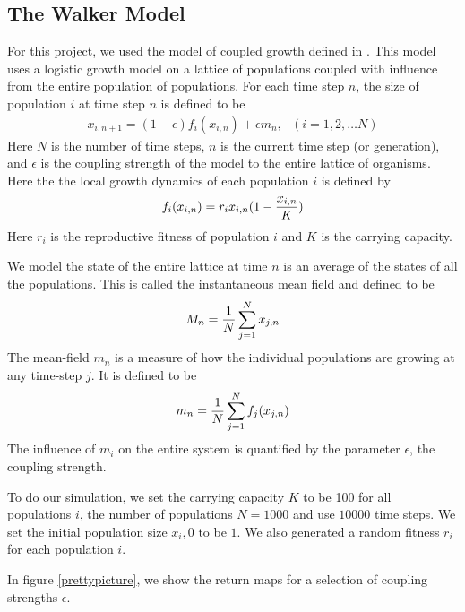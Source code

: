 \documentclass[conference]{IEEEtran}
\begin{document}
\subsection{The Walker Model}
For this project, we used the  model of coupled growth defined in \cite{Walker}. This model uses a logistic growth model on a lattice of populations coupled with influence from the entire population of populations.  For each time step $n$, the size of population $i$ at time step $n$ is defined to be
\begin{eqnarray}
x_{i, n+1} = (1 - \epsilon) f_i(x_{i,n}) + \epsilon m_n, \ \ \ (i=1, 2, \ldots N)
\label{coupling}
\end{eqnarray}
Here $N$ is the number of time steps, $n$ is the current time step (or generation), and $\epsilon$ is the coupling strength of the model to the entire lattice of organisms.   Here the the local growth dynamics of each population $i$ is defined by 
\begin{eqnarray}
f_i(x_{i,n}) = r_i x_{i,n} (1 - {x_{i,n} \over K})
\label{individual}
\end{eqnarray}
Here $r_i$ is the reproductive fitness of population $i$ and $K$ is the carrying capacity.    

We model the state of the entire lattice at time $n$ is an average of the states of all the populations.  This is called the instantaneous mean field and defined to be
\begin{eqnarray}
M_n = { 1 \over N} \sum _{j=1}^N x_{j,n}
\label{bigM}
\end{eqnarray}
 The mean-field $m_n$ is a measure of how the individual populations are growing at any time-step $j$.  It is defined to be 
 \begin{eqnarray}
 m_n = {1 \over N} \sum_{j=1}^N f_j(x_{j,n})
 \label{littlem}
\end{eqnarray}
The influence of $m_i$ on the entire system is quantified by the parameter $\epsilon$, the coupling strength.  
 
To do our simulation,  we set the carrying capacity $K$ to be 100 for all populations $i$, the number of populations $N = 1000$ and use $10000$ time steps.   We set the initial population size $x_i, 0$ to be $1$.   We also generated a random fitness $r_i$ for each population $i$.   

In figure \ref{prettypicture}, we show the return maps for a selection of coupling strengths $\epsilon$.  
\end{document}
